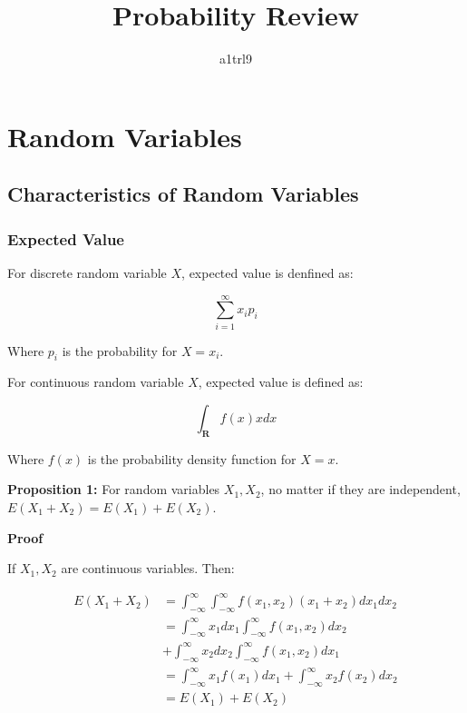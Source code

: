 \documentclass{article}
\author{a1trl9}
\title{Probability Review}
\date{}
\begin{document}
\maketitle

\section{Random Variables}

\subsection{Characteristics of Random Variables}

\subsubsection{Expected Value}

For discrete random variable \(X\), expected value is denfined as:

\begin{equation}
\sum_{i=1}^{\infty}x_ip_i
\end{equation}

Where \(p_i\) is the probability for \(X=x_i\).

For continuous random variable \(X\), expected value is defined as:

\begin{equation}
    \int_{\mathbf{R}}f(x)xdx
\end{equation}

Where \(f(x)\) is the probability density function for \(X=x\).

\vspace{2mm}
\textbf{Proposition 1:} For random variables \(X_1, X_2\), no matter if
they are independent, \(E(X_1+X_2)=E(X_1)+E(X_2)\).

\textbf{Proof}

If \(X_1, X_2\) are continuous variables. Then:

\begin{equation}
\begin{split}
    E(X_1 + X_2)&=\int_{-\infty}^{\infty}
    \int_{-\infty}^{\infty}f(x_1, x_2)(x_1+x_2)dx_1dx_2\\
    &=\int_{-\infty}^{\infty}x_1dx_1\int_{-\infty}^{\infty}f(x_1,x_2)dx_2\\
    &+\int_{-\infty}^{\infty}x_2dx_2\int_{-\infty}^{\infty}f(x_1,x_2)dx_1\\
    &=\int_{-\infty}^{\infty}x_1f(x_1)dx_1+\int_{-\infty}^{\infty}x_2f(x_2)dx_2\\
    &=E(X_1)+E(X_2)
\end{split}
\end{equation}
\end{document}
